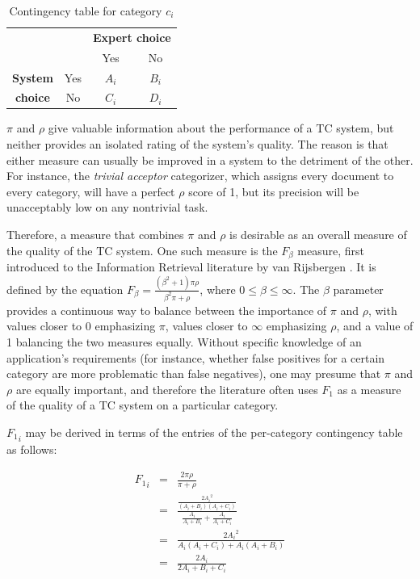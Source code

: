 \begin{table}
\begin{center}
\begin{tabular}{|c|c|c|c|}
\cline{3-4}
\multicolumn{2}{c|}{} & \multicolumn{2}{c|}{\textbf{Expert choice}} \\
\cline{3-4}
\multicolumn{2}{c|}{} & Yes & No \\
\hline
\textbf{System} & Yes & $A_i$ & $B_i$ \\
\cline{2-4}
\textbf{choice} & No  & $C_i$ & $D_i$ \\
\hline
\end{tabular}
\end{center}
\caption{Contingency table for category $c_i$}
\label{onecat-contingency}
\end{table}


$\pi$ and $\rho$ give valuable information about the performance of a
TC system, but neither provides an isolated rating of the system's
quality.  The reason is that either measure can usually be improved in
a system to the detriment of the other.\cite[p. 35]{sebastiani:02} For
instance, the \emph{trivial acceptor} categorizer, which assigns every
document to every category, will have a perfect $\rho$ score of 1, but
its precision will be unacceptably low on any nontrivial task.

Therefore, a measure that combines $\pi$ and $\rho$ is desirable as an
overall measure of the quality of the TC system.  One such measure is
the $F_\beta$ measure, first introduced to the Information Retrieval
literature by van Rijsbergen \cite[ch. 7]{rijsbergen:79}.  It is
defined by the equation $F_\beta = \frac{(\beta^2 + 1)\pi\rho}{\beta^2
\pi + \rho}$, where $0 \leq \beta \leq \infty$.  The $\beta$ parameter
provides a continuous way to balance between the importance of $\pi$
and $\rho$, with values closer to 0 emphasizing $\pi$, values closer
to $\infty$ emphasizing $\rho$, and a value of 1 balancing the two
measures equally.  Without specific knowledge of an application's
requirements (for instance, whether false positives for a certain
category are more problematic than false negatives), one may presume
that $\pi$ and $\rho$ are equally important, and therefore the
literature often uses $F_1$ as a measure of the quality of a TC system
on a particular category.

${F_1}_i$ may be derived in terms of the entries of the per-category
contingency table as follows:

\begin{eqnarray*}
{F_1}_i 
 & = & \frac{ 2 \pi \rho}{\pi + \rho} \\
 & = & \frac{ \frac{2 {A_i}^2}{(A_i+B_i)(A_i+C_i)} } { \frac{A_i}{A_i+B_i} + \frac{A_i}{A_i+C_i} } \\
 & = & \frac{ 2 {A_i}^2 }                            { A_i(A_i+C_i) + A_i(A_i+B_i) } \\
 & = & \frac{ 2 A_i }                                { 2 A_i + B_i + C_i } \\
\end{eqnarray*}

